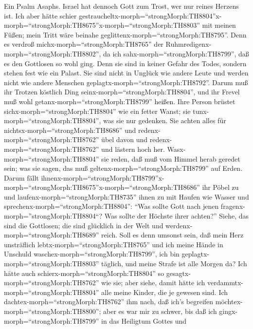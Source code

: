 Ein Psalm Asaphs. Israel hat dennoch Gott zum Trost, wer
nur reines Herzens ist.  Ich aber hätte schier
gestraucheltx-morph=``strongMorph:TH8804''\textbar x-morph=``strongMorph:TH8675''x-morph=``strongMorph:TH8803''
mit meinen Füßen; mein Tritt wäre beinahe
geglittenx-morph=``strongMorph:TH8795''.  Denn es verdroß
michx-morph=``strongMorph:TH8765'' der
Ruhmredigenx-morph=``strongMorph:TH8802'', da ich
sahx-morph=``strongMorph:TH8799'', daß es den Gottlosen so wohl ging.
 Denn sie sind in keiner Gefahr des Todes, sondern stehen
fest wie ein Palast.  Sie sind nicht in Unglück wie andere
Leute und werden nicht wie andere Menschen
geplagtx-morph=``strongMorph:TH8792''.  Darum muß ihr
Trotzen köstlich Ding seinx-morph=``strongMorph:TH8804'', und ihr Frevel
muß wohl getanx-morph=``strongMorph:TH8799'' heißen.  Ihre
Person brüstet sichx-morph=``strongMorph:TH8804'' wie ein fetter Wanst;
sie tunx-morph=``strongMorph:TH8804'', was sie nur gedenken.
 Sie achten alles für nichtsx-morph=``strongMorph:TH8686''
und redenx-morph=``strongMorph:TH8762'' übel davon und
redenx-morph=``strongMorph:TH8762'' und lästern hoch her. 
Wasx-morph=``strongMorph:TH8804'' sie reden, daß muß vom Himmel herab
geredet sein; was sie sagen, das muß
geltenx-morph=``strongMorph:TH8799'' auf Erden.  Darum
fällt
ihnenx-morph=``strongMorph:TH8799''\textbar x-morph=``strongMorph:TH8675''x-morph=``strongMorph:TH8686''
ihr Pöbel zu und laufenx-morph=``strongMorph:TH8735'' ihnen zu mit
Haufen wie Wasser  und
sprechenx-morph=``strongMorph:TH8804'': ``Was sollte Gott nach jenen
fragenx-morph=''strongMorph:TH8804``? Was sollte der Höchste ihrer
achten?''  Siehe, das sind die Gottlosen; die sind
glücklich in der Welt und werdenx-morph=``strongMorph:TH8689'' reich.
 Soll es denn umsonst sein, daß mein Herz unsträflich
lebtx-morph=``strongMorph:TH8765'' und ich meine Hände in Unschuld
waschex-morph=``strongMorph:TH8799'',  ich bin
geplagtx-morph=``strongMorph:TH8803'' täglich, und meine Strafe ist alle
Morgen da?  Ich hätte auch
schierx-morph=``strongMorph:TH8804'' so
gesagtx-morph=``strongMorph:TH8762'' wie sie; aber siehe, damit hätte
ich verdammtx-morph=``strongMorph:TH8804'' alle meine Kinder, die je
gewesen sind.  Ich dachtex-morph=``strongMorph:TH8762'' ihm
nach, daß ich's begreifen möchtex-morph=``strongMorph:TH8800''; aber es
war mir zu schwer,  bis daß ich
gingx-morph=``strongMorph:TH8799'' in das Heiligtum Gottes und
